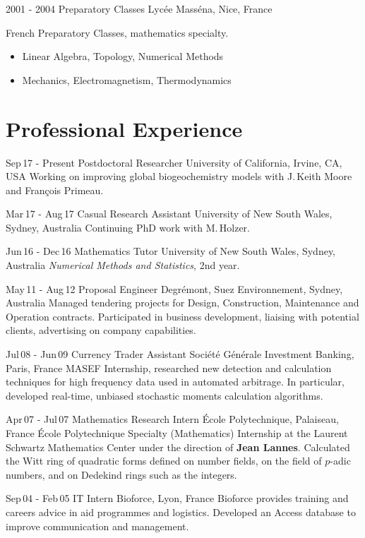 \documentclass[]{friggeri-cv}
\begin{document}
\begin{entrylist}
  \entry
    {2001 - 2004}
    {Preparatory Classes}
    {Lyc\'{e}e Mass\'{e}na, Nice, France}
    {French Preparatory Classes, mathematics specialty.
    \begin{itemize}
        \item Linear Algebra, Topology, Numerical Methods
        \item Mechanics, Electromagnetism, Thermodynamics
    \end{itemize}
    }


\end{entrylist}

\section{Professional {\color{pblue}Exp}erience}
\begin{entrylist}
  \entry
    {Sep$\,$17 - Present}
    {Postdoctoral Researcher}
    {University of California, Irvine, CA, USA}
    {Working on improving global biogeochemistry models with J.\,Keith Moore and Fran\c{c}ois Primeau.}


  \entry
    {Mar$\,$17 - Aug$\,$17}
    {Casual Research Assistant}
    {University of New South Wales, Sydney, Australia}
    {Continuing PhD work with M.\,Holzer.
    }

  \entry
    {Jun$\,$16 - Dec$\,$16}
    {Mathematics Tutor}
    {University of New South Wales, Sydney, Australia}
    {\emph{Numerical Methods and Statistics}, 2nd year.
    }

  \entry
    {May$\,$11 - Aug$\,$12}
    {Proposal Engineer}
    {Degr\'{e}mont, Suez Environnement, Sydney, Australia}
    {Managed tendering projects for Design, Construction, Maintenance and Operation contracts.
    Participated in business development, liaising with potential clients, advertising on company capabilities.
    }

  \entry
    {Jul$\,$08 - Jun$\,$09}
    {Currency Trader Assistant}
    {Soci\'{e}t\'{e} G\'{e}n\'{e}rale Investment Banking, Paris, France}
    {MASEF Internship, researched new detection and calculation techniques for high frequency data used in automated arbitrage.
    In particular, developed real-time, unbiased stochastic moments calculation algorithms.
    }


  \entry
    {Apr$\,$07 - Jul$\,$07}
    {Mathematics Research Intern}
    {\'{E}cole Polytechnique, Palaiseau, France}
    {\'{E}cole Polytechnique Specialty (Mathematics) Internship at the Laurent Schwartz Mathematics Center under the direction of \textbf{Jean Lannes}. Calculated the Witt ring of quadratic forms defined on number fields, on the field of $p$-adic numbers, and on Dedekind rings such as the integers.
    }


  \entry
    {Sep$\,$04 - Feb$\,$05}
    {IT Intern}
    {Bioforce, Lyon, France}
    {Bioforce provides training and careers advice in aid programmes and logistics. Developed an Access database to improve communication and management.
    }

\end{entrylist}
\end{document}
